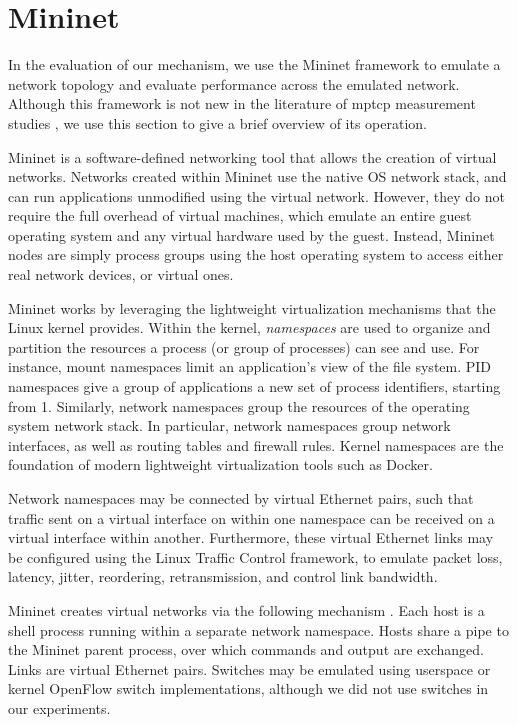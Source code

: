 \documentclass{cwru}
\begin{document}

\section{Mininet}
\label{sec:mn}

In the evaluation of our mechanism, we use the Mininet \cite{mininet} framework
to emulate a network topology and evaluate performance across the emulated
network. Although this framework is not new in the literature of \ac{mptcp}
measurement studies \cite{paasch2013benefits,paasch2014experimental}, we use
this section to give a brief overview of its operation.

Mininet is a software-defined networking tool that allows the creation of
virtual networks. Networks created within Mininet use the native OS network
stack, and can run applications unmodified using the virtual network. However,
they do not require the full overhead of virtual machines, which emulate an
entire guest operating system and any virtual hardware used by the guest.
Instead, Mininet nodes are simply process groups using the host operating system
to access either real network devices, or virtual ones.

Mininet works by leveraging the lightweight virtualization mechanisms that the
Linux kernel provides. Within the kernel, \emph{namespaces} are used to organize
and partition the resources a process (or group of processes) can see and use.
For instance, mount namespaces limit an application's view of the file system.
PID namespaces give a group of applications a new set of process identifiers,
starting from 1. Similarly, network namespaces group the resources of the
operating system network stack. In particular, network namespaces group network
interfaces, as well as routing tables and firewall rules. Kernel namespaces are
the foundation of modern lightweight virtualization tools such as Docker.

Network namespaces may be connected by virtual Ethernet pairs, such that traffic
sent on a virtual interface on within one namespace can be received on a virtual
interface within another. Furthermore, these virtual Ethernet links may be
configured using the Linux Traffic Control framework, to emulate packet loss,
latency, jitter, reordering, retransmission, and control link bandwidth.

Mininet creates virtual networks via the following mechanism
\cite{lantz2010network}. Each host is a shell process running within a separate
network namespace. Hosts share a pipe to the Mininet parent process, over which
commands and output are exchanged. Links are virtual Ethernet pairs. Switches
may be emulated using userspace or kernel OpenFlow switch implementations,
although we did not use switches in our experiments.
\end{document}
